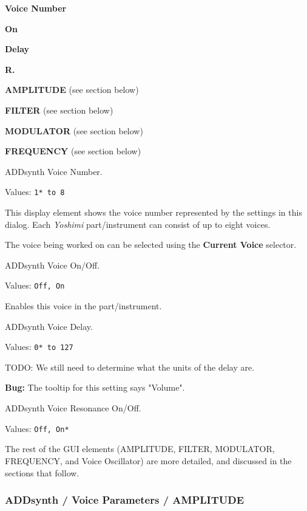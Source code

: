    \begin{enumber}
      \item \textbf{Voice Number}
      \item \textbf{On}
      \item \textbf{Delay}
      \item \textbf{R.}
      \item \textbf{AMPLITUDE} (see section below)
      \item \textbf{FILTER} (see section below)
      \item \textbf{MODULATOR} (see section below)
      \item \textbf{FREQUENCY} (see section below)
   \end{enumber}

   \setcounter{ItemCounter}{0}      %

   ADDsynth Voice Number.

   Values: \texttt{1* to 8}

   This display element shows the voice number represented by the settings
   in this dialog.  Each \textsl{Yoshimi} part/instrument can consist of up
   to eight voices.

   The voice being worked on can be selected using the
   \textbf{Current Voice} selector.

   ADDsynth Voice On/Off.

   Values: \texttt{Off, On}

   Enables this voice in the part/instrument.

   ADDsynth Voice Delay.

   Values: \texttt{0* to 127}

   TODO: We still need to determine what the units of the delay are.

   \textbf{Bug:}
   The tooltip for this setting says "Volume".

   ADDsynth Voice Resonance On/Off.

   Values: \texttt{Off, On*}

   The rest of the GUI elements
   (AMPLITUDE, FILTER, MODULATOR, FREQUENCY, and Voice Oscillator)
   are more detailed, and discussed in the sections that follow.

\subsubsection{ADDsynth / Voice Parameters / AMPLITUDE}
\label{subsubsec:addsynth_voice_parameters_amplitude}

